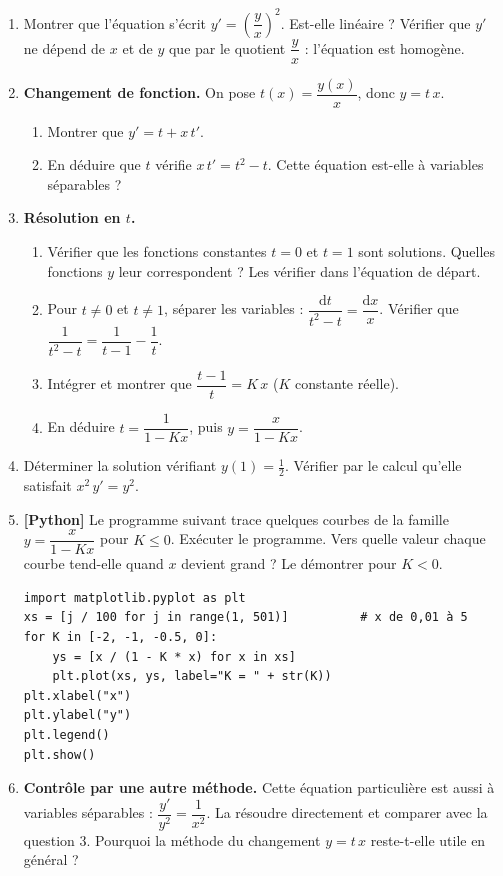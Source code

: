 \documentclass[a4paper,11pt]{article}
\newcommand{\rep}[1]{\par\noindent\begin{minipage}[t][#1cm]{\linewidth}\mbox{}\end{minipage}\par}
\newcommand{\py}{{\color{uimmred}\small\bfseries[Python]}}
\newcommand{\dd}{\mathrm{d}}
\begin{document}
\begin{enumerate}
  \needspace{3cm}
  \item Montrer que l'équation s'écrit $y' = \left(\dfrac{y}{x}\right)^2$. Est-elle linéaire ? Vérifier que $y'$ ne dépend de $x$ et de $y$ que par le quotient $\dfrac{y}{x}$ : l'équation est homogène.
  \rep{2}
  \needspace{5cm}
  \item \textbf{Changement de fonction.} On pose $t(x) = \dfrac{y(x)}{x}$, donc $y = t\,x$.
  \begin{enumerate}
    \item Montrer que $y' = t + x\,t'$.
    \rep{1.5}
    \item En déduire que $t$ vérifie $x\,t' = t^2 - t$. Cette équation est-elle à variables séparables ?
    \rep{2}
  \end{enumerate}
  \needspace{4cm}
  \item \textbf{Résolution en $t$.}
  \begin{enumerate}
    \item Vérifier que les fonctions constantes $t = 0$ et $t = 1$ sont solutions. Quelles fonctions $y$ leur correspondent ? Les vérifier dans l'équation de départ.
    \rep{2.5}
    \item Pour $t \neq 0$ et $t \neq 1$, séparer les variables : $\dfrac{\dd t}{t^2 - t} = \dfrac{\dd x}{x}$. Vérifier que $\dfrac{1}{t^2 - t} = \dfrac{1}{t - 1} - \dfrac{1}{t}$.
    \rep{2.5}
    \item Intégrer et montrer que $\dfrac{t - 1}{t} = K\,x$ ($K$ constante réelle).
    \rep{2.5}
    \item En déduire $t = \dfrac{1}{1 - K x}$, puis $y = \dfrac{x}{1 - K x}$.
    \rep{2}
  \end{enumerate}
  \needspace{3.5cm}
  \item Déterminer la solution vérifiant $y(1) = \frac12$. Vérifier par le calcul qu'elle satisfait $x^2\,y' = y^2$.
  \rep{3}
  \needspace{9cm}
  \item \py{} Le programme suivant trace quelques courbes de la famille $y = \dfrac{x}{1 - Kx}$ pour $K \leq 0$. Exécuter le programme. Vers quelle valeur chaque courbe tend-elle quand $x$ devient grand ? Le démontrer pour $K < 0$.
\begin{lstlisting}[style=uimmpython]
import matplotlib.pyplot as plt
xs = [j / 100 for j in range(1, 501)]          # x de 0,01 à 5
for K in [-2, -1, -0.5, 0]:
    ys = [x / (1 - K * x) for x in xs]
    plt.plot(xs, ys, label="K = " + str(K))
plt.xlabel("x")
plt.ylabel("y")
plt.legend()
plt.show()
\end{lstlisting}
  \rep{2.5}
  \needspace{4cm}
  \item \textbf{Contrôle par une autre méthode.} Cette équation particulière est aussi à variables séparables : $\dfrac{y'}{y^2} = \dfrac{1}{x^2}$. La résoudre directement et comparer avec la question 3. Pourquoi la méthode du changement $y = t\,x$ reste-t-elle utile en général ?
  \rep{3.5}
\end{enumerate}
\end{document}
